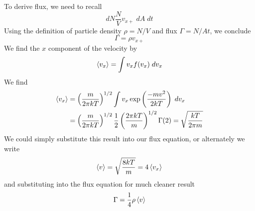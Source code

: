 \documentclass[../../../Main.tex]{subfiles}
\begin{document}
To derive flux, we need to recall
\begin{equation*}
    dN\frac{N}{V}v_{x+}\;dA\;dt
\end{equation*}
Using the definition of particle density $\rho=N/V$ and flux $\Gamma=N/At$, we conclude 
\begin{equation*}
    \Gamma=\rho v_{x+}
\end{equation*}
We find the $x$ component of the velocity by 
\begin{equation*}
    \braket{v_x}=\int v_xf(v_x)\;dv_x
\end{equation*} 
We find 
\begin{align*}
    \braket{v_x}&=\left(\frac{m}{2\pi kT}\right)^{1/2}\int v_x\exp\left(\frac{-m v^2}{2kT}\right)\;dv_x\\
    &=\left(\frac{m}{2\pi kT}\right)^{1/2}\frac{1}{2}\left(\frac{2\pi kT}{m}\right)^{1/2}\Gamma(2)=\sqrt{\frac{kT}{2\pi m}}
\end{align*}
We could simply substitute this result into our flux equation, or alternately we write 
\begin{equation*}
    \braket{v}=\sqrt{\frac{8kT}{m}}=4\braket{v_x}
\end{equation*}
and substituting into the flux equation for much cleaner result
\begin{equation*}
    \Gamma=\frac{1}{4}\rho\braket{v}
\end{equation*}
\end{document}
